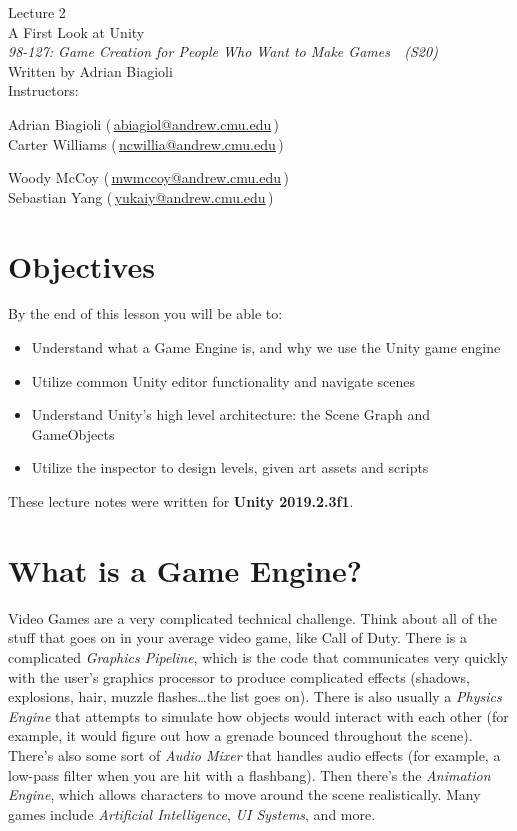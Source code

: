 \documentclass[11pt]{article}
\makeatletter
\newcommand{\lecturenum}{2}
\newcommand{\lecturename}{A First Look at Unity}
\newcommand{\authorname}{Adrian Biagioli}
\newcommand{\coursenum}{98-127}
\newcommand{\coursename}{Game Creation for People Who Want to Make Games}
\newcommand{\coursesem}{S20}
\newcommand{\instructors}{\begin{minipage}[t]{0.4\columnwidth}\centering Adrian Biagioli (\,\href{mailto:abiagiol@andrew.cmu.edu}{abiagiol@andrew.cmu.edu}\,) \\ Carter Williams (\,\href{mailto:ncwillia@andrew.cmu.edu}{ncwillia@andrew.cmu.edu}\,)\end{minipage}
\begin{minipage}[t]{0.4\columnwidth}\centering Woody McCoy (\,\href{mailto:mwmccoy@andrew.cmu.edu}{mwmccoy@andrew.cmu.edu}\,) \\ Sebastian Yang (\,\href{mailto:yukaiy@andrew.cmu.edu}{yukaiy@andrew.cmu.edu}\,)\end{minipage}}
\makeatother
\begin{document}
\thispagestyle{plain}
{
    \vspace{1.5em}
    \begin{center}
    {
        \huge
        Lecture \lecturenum \\
        \vspace{0.5em}
        \lecturename
        \vspace{0.4em}
    } \\
    {
        \it
        \coursenum: \coursename\ \ (\coursesem)
    } \\
    \vspace{1.0em}
    Written by \authorname \\
    \vspace{0.7em}
    Instructors:\\ \instructors
    \end{center}
}

\section{Objectives}

By the end of this lesson you will be able to:
\begin{itemize}
    \item Understand what a Game Engine is, and why we use the Unity game engine
    \item Utilize common Unity editor functionality and navigate scenes
    \item Understand Unity's high level architecture: the Scene Graph and GameObjects
    \item Utilize the inspector to design levels, given art assets and scripts
\end{itemize}

\noindent These lecture notes were written for {\bf Unity 2019.2.3f1}.

\section{What is a Game Engine?}

\par Video Games are a very complicated technical challenge.  Think about all of the stuff that goes on in your average video game, like Call of Duty.  There is a complicated {\it Graphics Pipeline}, which is the code that communicates very quickly with the user's graphics processor to produce complicated effects (shadows, explosions, hair, muzzle flashes\dots the list goes on).  There is also usually a {\it Physics Engine} that attempts to simulate how objects would interact with each other (for example, it would figure out how a grenade bounced throughout the scene).  There's also some sort of {\it Audio Mixer} that handles audio effects (for example, a low-pass filter when you are hit with a flashbang).  Then there's the {\it Animation Engine}, which allows characters to move around the scene realistically.  Many games include {\it Artificial Intelligence}, {\it UI Systems}, and more.
\end{document}
